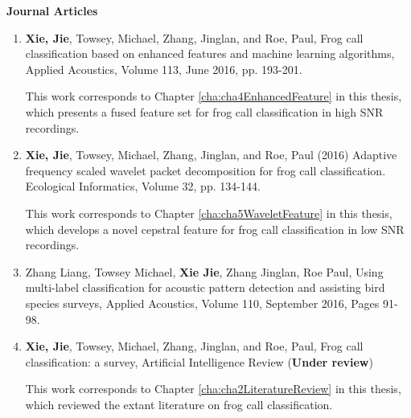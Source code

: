 {\textbf{Journal Articles}}
\begin{enumerate} 

\item  \textbf{Xie, Jie}, Towsey, Michael, Zhang, Jinglan, and Roe, Paul, Frog call classification based on enhanced features and machine learning algorithms, Applied Acoustics, Volume 113, June 2016, pp. 193-201.

This work corresponds to Chapter \ref{cha:cha4EnhancedFeature} in this thesis, which presents a fused feature set for frog call classification in high SNR recordings.

\item	\textbf{Xie, Jie}, Towsey, Michael, Zhang, Jinglan, and Roe, Paul (2016) Adaptive frequency scaled wavelet packet decomposition for frog call classification.  Ecological Informatics, Volume 32, pp. 134-144.

This work corresponds to Chapter \ref{cha:cha5WaveletFeature} in this thesis, which develops a novel cepstral feature for frog call classification in low SNR recordings.



\item	Zhang Liang, Towsey Michael, \textbf{Xie Jie}, Zhang Jinglan, Roe Paul,  Using multi-label classification for acoustic pattern detection and assisting bird species surveys, Applied Acoustics, Volume 110, September 2016, Pages 91-98.

\item \textbf{Xie, Jie}, Towsey, Michael, Zhang, Jinglan, and Roe, Paul, Frog call classification: a survey, Artificial Intelligence Review (\textbf{Under review})


This work corresponds to Chapter \ref{cha:cha2LiteratureReview} in this thesis, which reviewed the extant literature on frog call classification.



\end{enumerate}

